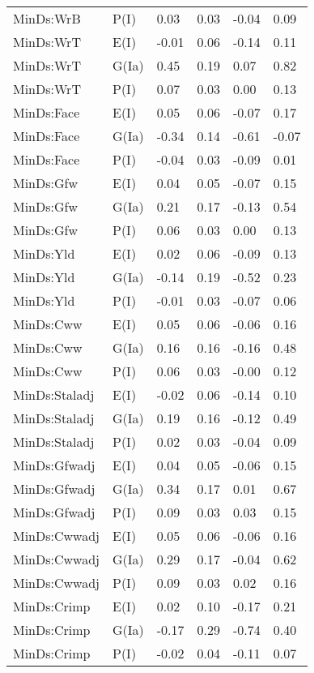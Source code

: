 \begin{center}
\begin{longtable}{|p{1.1in}|p{0.7in}|p{0.7in}|p{0.6in}|p{0.6in}|p{0.6in}|}
  MinDs:WrB & P(I) & 0.03 & 0.03 & -0.04 & 0.09 \\ 
  MinDs:WrT & E(I) & -0.01 & 0.06 & -0.14 & 0.11 \\ 
  MinDs:WrT & G(Ia) & 0.45 & 0.19 & 0.07 & 0.82 \\ 
  MinDs:WrT & P(I) & 0.07 & 0.03 & 0.00 & 0.13 \\ 
  MinDs:Face & E(I) & 0.05 & 0.06 & -0.07 & 0.17 \\ 
  MinDs:Face & G(Ia) & -0.34 & 0.14 & -0.61 & -0.07 \\ 
  MinDs:Face & P(I) & -0.04 & 0.03 & -0.09 & 0.01 \\ 
  MinDs:Gfw & E(I) & 0.04 & 0.05 & -0.07 & 0.15 \\ 
  MinDs:Gfw & G(Ia) & 0.21 & 0.17 & -0.13 & 0.54 \\ 
  MinDs:Gfw & P(I) & 0.06 & 0.03 & 0.00 & 0.13 \\ 
  MinDs:Yld & E(I) & 0.02 & 0.06 & -0.09 & 0.13 \\ 
  MinDs:Yld & G(Ia) & -0.14 & 0.19 & -0.52 & 0.23 \\ 
  MinDs:Yld & P(I) & -0.01 & 0.03 & -0.07 & 0.06 \\ 
  MinDs:Cww & E(I) & 0.05 & 0.06 & -0.06 & 0.16 \\ 
  MinDs:Cww & G(Ia) & 0.16 & 0.16 & -0.16 & 0.48 \\ 
  MinDs:Cww & P(I) & 0.06 & 0.03 & -0.00 & 0.12 \\ 
  MinDs:Staladj & E(I) & -0.02 & 0.06 & -0.14 & 0.10 \\ 
  MinDs:Staladj & G(Ia) & 0.19 & 0.16 & -0.12 & 0.49 \\ 
  MinDs:Staladj & P(I) & 0.02 & 0.03 & -0.04 & 0.09 \\ 
  MinDs:Gfwadj & E(I) & 0.04 & 0.05 & -0.06 & 0.15 \\ 
  MinDs:Gfwadj & G(Ia) & 0.34 & 0.17 & 0.01 & 0.67 \\ 
  MinDs:Gfwadj & P(I) & 0.09 & 0.03 & 0.03 & 0.15 \\ 
  MinDs:Cwwadj & E(I) & 0.05 & 0.06 & -0.06 & 0.16 \\ 
  MinDs:Cwwadj & G(Ia) & 0.29 & 0.17 & -0.04 & 0.62 \\ 
  MinDs:Cwwadj & P(I) & 0.09 & 0.03 & 0.02 & 0.16 \\ 
  MinDs:Crimp & E(I) & 0.02 & 0.10 & -0.17 & 0.21 \\ 
  MinDs:Crimp & G(Ia) & -0.17 & 0.29 & -0.74 & 0.40 \\ 
  MinDs:Crimp & P(I) & -0.02 & 0.04 & -0.11 & 0.07 \\ 

\end{longtable}
\end{center}
